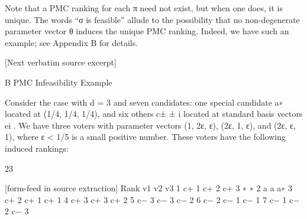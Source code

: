 \documentclass[10pt]{article}
\begin{document}
\begin{ReviewVerbatim}
Note that a PMC ranking for each π need not exist, but when one does, it is unique. The words “σ
is feasible” allude to the possibility that no non-degenerate parameter vector θ induces the unique
PMC ranking. Indeed, we have such an example; see Appendix B for details.

[Next verbatim source excerpt]

B    PMC Infeasibility Example

Consider the case with d = 3 and seven candidates: one special candidate a∗ located at
(1/4, 1/4, 1/4), and six others c±                                    ±
                                 i located at standard basis vectors ei . We have three voters with
parameter vectors (1, 2ε, ε), (2ε, 1, ε), and (2ε, ε, 1), where ε < 1/5 is a small positive number.
These voters have the following induced rankings:


                                                        23

[form-feed in source extraction]
                                          Rank          v1       v2   v3
                                              1         c+
                                                         1       c+
                                                                  2   c+
                                                                       3
                                                         ∗        ∗
                                              2         a        a    a∗
                                              3         c+
                                                         2       c+
                                                                  1   c+
                                                                       1
                                              4         c+
                                                         3       c+
                                                                  3   c+
                                                                       2
                                              5         c−
                                                         3       c−
                                                                  3   c−
                                                                       2
                                              6         c−
                                                         2       c−
                                                                  1   c−
                                                                       1
                                              7         c−
                                                         1       c−
                                                                  2   c−
                                                                       3


\end{ReviewVerbatim}
\end{document}

